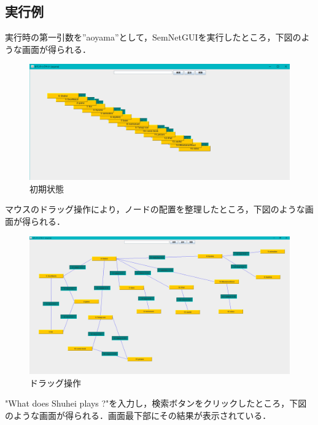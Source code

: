 \documentclass[12pt]{jarticle}
\begin{document}
\clearpage

\subsection{実行例}
実行時の第一引数を”aoyama''として，SemNetGUIを実行したところ，下図のような画面が得られる．

\begin{figure}[!hbt]
  	\begin{center}
  		\includegraphics[scale=0.25]{images/gui0.png}
	\end{center}
  	\caption{初期状態}
\end{figure}
\clearpage

マウスのドラッグ操作により，ノードの配置を整理したところ，下図のような画面が得られる．

\begin{figure}[!hbt]
  	\begin{center}
  		\includegraphics[scale=0.20]{images/gui1.png}
	\end{center}
  	\caption{ドラッグ操作}
\end{figure}
\clearpage

"What does Shuhei plays ?"を入力し，検索ボタンをクリックしたところ，下図のような画面が得られる．画面最下部にその結果が表示されている．
\end{document}
